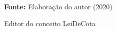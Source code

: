 \begin{figure}[ht!]
\centering

\caption{\textmd{Editor do conceito LeiDeCota}}
\label{fig:editorleicota}

\par\medskip\textbf{Fonte:} Elaboração do autor (2020) \par\medskip

\end{figure}

